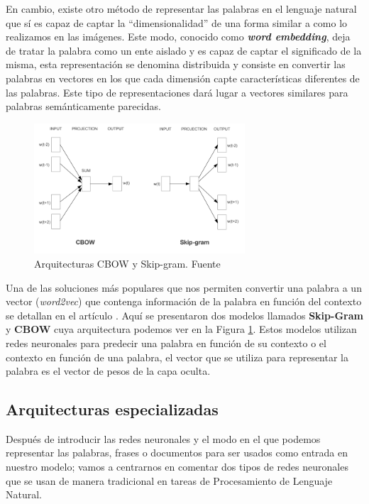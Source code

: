 En cambio, existe otro método de representar las palabras en el lenguaje natural que sí es capaz de captar la ``dimensionalidad'' de una forma similar a como lo realizamos en las imágenes. Este modo, conocido como \textit{\textbf{word embedding}}, deja de tratar la palabra como un ente aislado y  es capaz de captar el significado de la misma, esta representación se denomina distribuida y consiste en convertir las palabras en vectores en los que cada dimensión capte características diferentes de las palabras. Este tipo de representaciones dará lugar a vectores similares para palabras semánticamente parecidas. 


\begin{figure}[!ht]
	\centering
	\includegraphics[width=0.7\textwidth]{images/arte/word2vec}
	\caption{Arquitecturas CBOW y Skip-gram. Fuente \cite{word2vec}}
	\label{fig:wor2vec}
\end{figure}

Una de las soluciones más populares que nos permiten convertir una palabra a un vector (\textit{word2vec}) que contenga información de la palabra en función del contexto se detallan en el artículo \cite{word2vec} . Aquí se presentaron dos modelos llamados \textbf{Skip-Gram} y \textbf{CBOW} cuya arquitectura podemos ver en la Figura \ref{fig:wor2vec}. Estos modelos utilizan redes neuronales para predecir una palabra en función de su contexto o el contexto en función de una palabra, el vector que se utiliza para representar la palabra es el vector de pesos de la capa oculta. 



\subsection{Arquitecturas especializadas}

Después de introducir las redes neuronales y el modo en el que podemos representar las palabras, frases o documentos para ser usados como entrada en nuestro modelo; vamos a centrarnos en comentar dos tipos de redes neuronales que se usan de manera tradicional en tareas de Procesamiento de Lenguaje Natural. 

